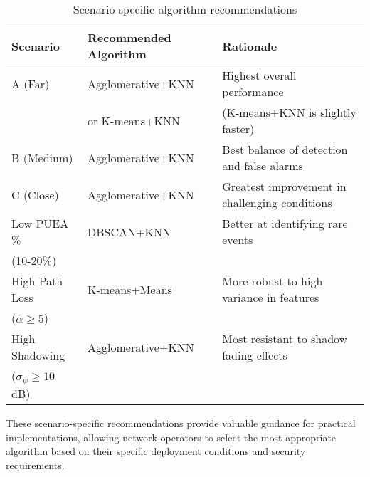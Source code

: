 \begin{table}[htbp]
    \centering
    \caption{Scenario-specific algorithm recommendations}
    \label{tab:scenario_recommendations}
    \begin{tabular}{lll}
        \toprule
        \textbf{Scenario} & \textbf{Recommended Algorithm} & \textbf{Rationale} \\
        \midrule
        A (Far) & Agglomerative+KNN & Highest overall performance \\
         & or K-means+KNN & (K-means+KNN is slightly faster) \\
        \midrule
        B (Medium) & Agglomerative+KNN & Best balance of detection and false alarms \\
        \midrule
        C (Close) & Agglomerative+KNN & Greatest improvement in challenging conditions \\
        \midrule
        Low PUEA \% & DBSCAN+KNN & Better at identifying rare events \\
        (10-20\%) & & \\
        \midrule
        High Path Loss & K-means+Means & More robust to high variance in features \\
        ($\alpha \geq 5$) & & \\
        \midrule
        High Shadowing & Agglomerative+KNN & Most resistant to shadow fading effects \\
        ($\sigma_{\psi} \geq 10$ dB) & & \\
        \bottomrule
    \end{tabular}
\end{table}

These scenario-specific recommendations provide valuable guidance for practical implementations, allowing network operators to select the most appropriate algorithm based on their specific deployment conditions and security requirements.
